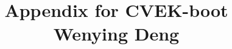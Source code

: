 \documentclass[11pt]{article}
\begin{document}
\setlength{\parindent}{0pt}

\title{ Appendix for CVEK-boot\\Wenying Deng \vspace{-1ex}}

\pretitle{\begin{flushright}\normalsize}
\posttitle{\par\end{flushright}}
\author{}
\date{}
\vspace{-10em}
\maketitle
\vspace{6em}


\tableofcontents
\clearpage
\vspace{2em}
\setcounter{equation}{0}
\renewcommand{\theequation}{1.\arabic{equation}}
\end{document}
